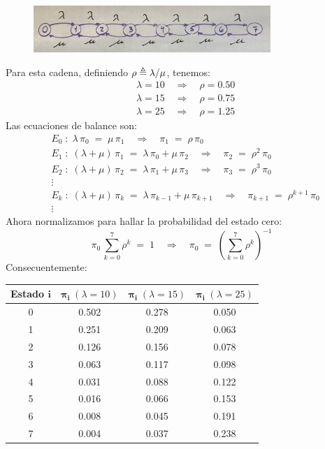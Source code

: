 \documentclass[ a4paper, twoside, 11pt]{article}
\begin{document}
\begin{problem}
\begin{enumerate}[label=\textbf{\alph*)}]
\begin{figure}[htb]
\centering
\includegraphics[width=0.8\textwidth]{problema-1-A.jpg}
\end{figure}

Para esta cadena, definiendo $\rho \triangleq \lambda / \mu$, tenemos: 
\begin{align*}
& \lambda = 10 \quad \Longrightarrow \quad \rho = 0.50 \\
& \lambda = 15 \quad \Longrightarrow \quad \rho = 0.75 \\
& \lambda = 25 \quad \Longrightarrow \quad \rho = 1.25
\end{align*}
Las ecuaciones de balance son: 
\begin{align*}
& E_0 \; \colon \; \lambda \, \pi_0 \; = \; \mu \, \pi_1
\quad \Longrightarrow \quad
\pi_1 \; = \; \rho \, \pi_0 \\
& E_1 \; \colon \; (\lambda + \mu) \, \pi_1
\; = \; \lambda \, \pi_0 + \mu \, \pi_2
\quad \Longrightarrow \quad
\pi_2 \; = \; \rho^2 \, \pi_0 \\
& E_2 \; \colon \; (\lambda + \mu) \, \pi_2
\; = \; \lambda \, \pi_1 + \mu \, \pi_3
\quad \Longrightarrow \quad
\pi_3 \; = \; \rho^3 \, \pi_0 \\
& \vdots \\
& E_k \; \colon \; (\lambda + \mu) \, \pi_{k} \; = \; \lambda \, \pi_{k-1} + \mu \, \pi_{k+1} \quad \Longrightarrow \quad
\pi_{k+1} \; = \; \rho^{k+1} \, \pi_0 \\
& \vdots
\end{align*}
Ahora normalizamos para hallar la probabilidad del estado cero: 
\[
\pi_0 \, \sum_{k=0}^7 \rho^k \; = \; 1 \quad \Longrightarrow \quad
\pi_0 \; = \; \left( \sum_{k=0}^7 \rho^k \right)^{-1}
\]
Consecuentemente: 
\begin{table}[htb]
\centering
\begin{tabular}{|c|c|c|c|}
\hline
\textbf{Estado} $\boldsymbol{i}$ & $\boldsymbol{\pi_i} \; ( \lambda = 10 )$ & $\boldsymbol{\pi_i} \; ( \lambda = 15 )$ & $\boldsymbol{\pi_i} \; ( \lambda = 25 )$ \\ \hline
0 & 0.502 & 0.278 & 0.050 \\ \hline
1 & 0.251 & 0.209 & 0.063 \\ \hline
2 & 0.126 & 0.156 & 0.078 \\ \hline
3 & 0.063 & 0.117 & 0.098 \\ \hline
4 & 0.031 & 0.088 & 0.122 \\ \hline
5 & 0.016 & 0.066 & 0.153 \\ \hline
6 & 0.008 & 0.045 & 0.191 \\ \hline
7 & 0.004 & 0.037 & 0.238 \\ \hline
\end{tabular}
\end{table}


\end{enumerate}
\end{problem}
\end{document}
